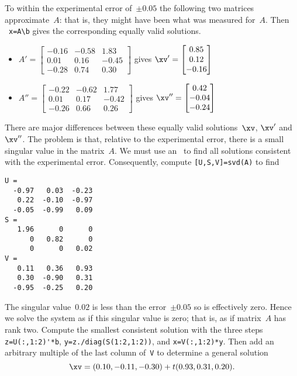 \begin{example}
\begin{enumerate}
\begin{solution}
To within the experimental error of~\(\pm0.05\) the following two matrices approximate~\(A\): that is, they might have been what was measured for~\(A\).
Then \script\ \verb|x=A\b| gives the corresponding equally valid solutions.
\begin{itemize}
\item \(A'=\begin{bmatrix} -0.16&-0.58&1.83
\\ 0.01&0.16&-0.45
\\ -0.28&0.74&0.30 \end{bmatrix}\) gives
\(\xv'=\begin{bmatrix} 0.85\\0.12\\-0.16 \end{bmatrix}\)
\item \(A''=\begin{bmatrix} -0.22&-0.62&1.77
\\ 0.01&0.17&-0.42
\\ -0.26&0.66&0.26 \end{bmatrix}\) gives
\(\xv''=\begin{bmatrix} 0.42\\-0.04\\-0.24 \end{bmatrix}\)
\end{itemize}
There are major differences between these equally valid solutions~\(\xv\), \(\xv'\) and~\(\xv''\).
The problem is that, relative to the experimental error, there is a small singular value in the matrix~\(A\).
We must use an \svd\ to find all solutions consistent with the experimental error. 
Consequently, compute \verb|[U,S,V]=svd(A)| to find \twodp
\begin{verbatim}
U =
  -0.97   0.03  -0.23
   0.22  -0.10  -0.97
  -0.05  -0.99   0.09
S =
   1.96      0      0
      0   0.82      0
      0      0   0.02
V =
   0.11   0.36   0.93
   0.30  -0.90   0.31
  -0.95  -0.25   0.20
\end{verbatim}
The singular value~\(0.02\) is less than the error~\(\pm0.05\) so is effectively zero.
Hence we solve the system as if this singular value is zero; that is, as if matrix~\(A\) has rank two.
Compute the smallest consistent solution with the three steps \verb|z=U(:,1:2)'*b|, \verb|y=z./diag(S(1:2,1:2))|, and \verb|x=V(:,1:2)*y|.
Then add an arbitrary multiple of the last column of~\verb|V| to determine a general solution 
\begin{equation*}
\xv=(0.10,-0.11,-0.30)+t(0.93,0.31,0.20).
\end{equation*}


\end{solution}
\end{enumerate}
\end{example}
